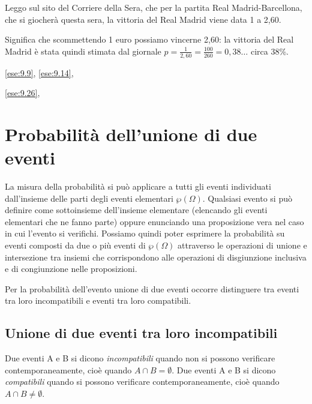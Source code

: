 \begin{esempio}
Leggo sul sito del Corriere della Sera, che per la partita Real 
Madrid-Barcellona, che si giocherà questa sera, la vittoria del Real Madrid 
viene data 1 a 2,60.

Significa che scommettendo 1 euro possiamo vincerne 2,60: la vittoria del Real 
Madrid è stata quindi stimata dal giornale $p=\frac 
1{2,60}=\frac{100}{260}=0,38\ldots$ circa 38\%.
\end{esempio}
\ref{ese:9.9}, 
\ref{ese:9.14}, 

\ref{ese:9.26}, 

\section{Probabilità dell'unione di due eventi}
\label{sec:09_unione}

La misura della probabilità si può applicare a tutti gli eventi individuati 
dall'insieme delle parti degli eventi elementari $\wp (\Omega )$. Qualsiasi 
evento si può definire come sottoinsieme dell'insieme elementare (elencando gli 
eventi elementari che ne fanno parte) oppure enunciando una proposizione vera 
nel caso in cui l'evento si verifichi. Possiamo quindi poter esprimere la 
probabilità su eventi composti da due o più eventi di $\wp (\Omega )$ 
attraverso 
le operazioni di unione e intersezione tra insiemi che corrispondono alle 
operazioni di disgiunzione inclusiva e di congiunzione nelle proposizioni.

Per la probabilità dell'evento unione di due eventi occorre distinguere tra 
eventi tra loro incompatibili e eventi tra loro compatibili.

\subsection[Unione di due eventi tra loro incompatibili]{Unione di due eventi 
tra loro incompatibili}

\begin{definizione}
Due eventi A e B si dicono \emph{incompatibili} quando non si possono 
verificare 
contemporaneamente, cioè quando $A\cap B=\emptyset $.
Due eventi A e B si dicono \emph{compatibili} quando si possono verificare 
contemporaneamente, cioè quando $A\cap B\neq \emptyset $.
\end{definizione}

